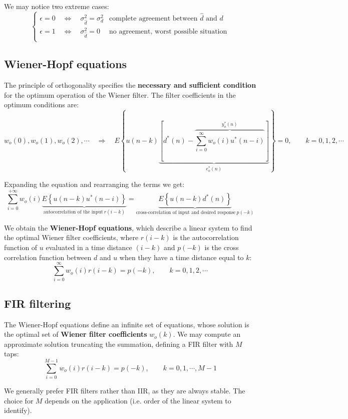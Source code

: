 We may notice two extreme cases:
\[
\begin{cases}
\epsilon = 0 \quad \Leftrightarrow \quad \sigma_{\hat{d}}^2 = \sigma_d^2 & \text{complete agreement between \(\hat{d}\) and \(d\)}\\[3pt]
\epsilon = 1 \quad \Leftrightarrow \quad \sigma_{\hat{d}}^2 = 0 & \text{no agreement, worst possible situation} \\
\end{cases}
\]

\subsection{Wiener-Hopf equations}

The principle of orthogonality specifies the \textbf{necessary and sufficient condition} for the optimum operation of the Wiener filter.
The filter coefficients in the optimum conditions are:
\[
w_o(0), w_o(1), w_o(2), \cdots \quad \Rightarrow \quad  E\left\{ u(n-k) \underbrace{\left[ d^*(n) - \overbrace{\sum_{i=0}^\infty w_o(i) u^*(n-i)}^{y_o^*(n)} \right]}_{e_o^*(n)} \right\} = 0, \qquad k = 0, 1, 2, \cdots
\]

Expanding the equation and rearranging the terms we get:
\[
\sum_{i=0}^{+\infty} w_o(i) \underbrace{E \left\{u(n-k) u^*(n-i)\right\}}_{\text{autocorrelation of the input} \ r(i-k)} = \underbrace{E \left\{u(n-k)d^*(n)\right\}}_{\text{cross-correlation of input and desired response} \ p(-k)}
\]

We obtain the \textbf{Wiener-Hopf equations}, which describe a linear system to find the optimal Wiener filter coefficients, where $r(i-k)$ is the autocorrelation function of $u$ evaluated in a time distance $(i-k)$ and $p(-k)$ is the cross correlation function between $d$ and $u$ when they have a time distance equal to $k$:
\[
\sum_{i=0}^\infty w_o(i) r(i-k) = p(-k), \qquad k = 0, 1, 2, \cdots
\]

\subsection{FIR filtering}

The Wiener-Hopf equations define an infinite set of equations, whose solution is the optimal set of \textbf{Wiener filter coefficients} \( w_o(k) \).
We may compute an approximate solution truncating the summation, defining a FIR filter with \( M \) taps:
\[
\sum_{i=0}^{M-1} w_o(i) r(i-k) = p(-k), \qquad k = 0, 1, \cdots, M-1
\]

We generally prefer FIR filters rather than IIR, as they are always stable.
The choice for \( M \) depends on the application (i.e. order of the linear system to identify).

